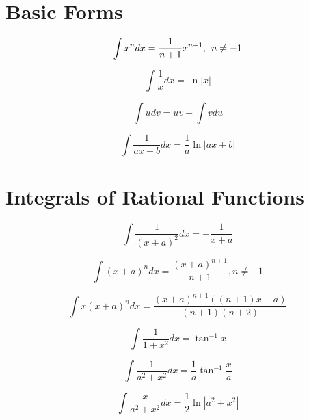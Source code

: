 \documentclass[12pt,a4paper,leqno]{article}
\date{\today} %
\begin{document}
  \pagestyle{empty}


  \section*{Basic Forms}

    \begin{equation}
    \int x^n dx = \frac{1}{n+1}x^{n+1},\hspace{1ex}n\neq -1
    \end{equation}

    \begin{equation}
    \int \frac{1}{x}dx = \ln |x|
    \end{equation}

    \begin{equation}
    \int u dv = uv - \int v du
    \end{equation}

    \begin{equation}
    \int \frac{1}{ax+b}dx = \frac{1}{a} \ln |ax + b|
    \end{equation}

    \section* {Integrals of Rational Functions}

    \begin{equation}
    \int \frac{1}{(x+a)^2}dx = -\frac{1}{x+a}
    \end{equation}

    \begin{equation}
    \int (x+a)^n dx = \frac{(x+a)^{n+1}}{n+1}, n\ne -1
    \end{equation}

    \begin{equation}
    \int x(x+a)^n dx = \frac{(x+a)^{n+1} ( (n+1)x-a)}{(n+1)(n+2)}
    \end{equation}

    \begin{equation}
    \int \frac{1}{1+x^2}dx = \tan^{-1}x
    \end{equation}


    \begin{equation}
    \int \frac{1}{a^2+x^2}dx = \frac{1}{a}\tan^{-1}\frac{x}{a}
    \end{equation}

    \begin{equation}
    \int \frac{x}{a^2+x^2}dx = \frac{1}{2}\ln|a^2+x^2|
    \end{equation}
\end{document}
